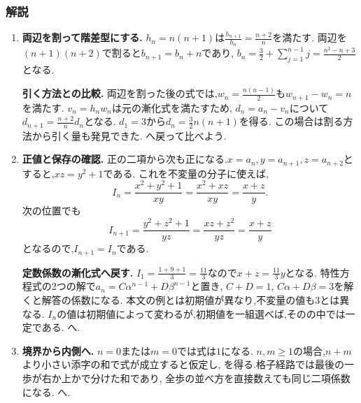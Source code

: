 \subsubsection{解説}
\begin{enumerate}[label=\textbf{問\arabic*.},format=\bookitemlink{practice-connections}{solution}{problem}]
  \item \textbf{両辺を割って階差型にする.}
    $h_n=n(n+1)$は$\frac{h_{n+1}}{h_n}=\frac{n+2}{n}$を満たす.
    両辺を$(n+1)(n+2)$で割ると$b_{n+1}=b_n+n$であり,
    $b_n=\frac32+\sum_{j=1}^{n-1}j=\frac{n^2-n+3}{2}$となる.
    \par\smallskip\textbf{引く方法との比較.}
    両辺を割った後の式では,$w_n=\frac{n(n-1)}{2}$も$w_{n+1}-w_n=n$を満たす.
    $v_n=h_nw_n$は元の漸化式を満たすため,
    $d_n=a_n-v_n$について$d_{n+1}=\frac{n+2}{n}d_n$となる.
    $d_1=3$から$d_n=\frac32n(n+1)$を得る.
    この場合は割る方法から引く量も発見できた.
    へ戻って比べよう.
  \item \textbf{正値と保存の確認.}
    正の二項から次も正になる.$x=a_n,y=a_{n+1},z=a_{n+2}$とすると,$xz=y^2+1$である.
    これを不変量の分子に使えば,
    \[
      I_n=\frac{x^2+y^2+1}{xy}
      =\frac{x^2+xz}{xy}=\frac{x+z}{y}.
    \]
    次の位置でも
    \[
      I_{n+1}=\frac{y^2+z^2+1}{yz}
      =\frac{xz+z^2}{yz}=\frac{x+z}{y}
    \]
    となるので,$I_{n+1}=I_n$である.
    \par\smallskip\textbf{定数係数の漸化式へ戻す.}
    $I_1=\frac{1+9+1}{3}=\frac{11}{3}$なので$x+z=\frac{11}{3}y$となる.
    特性方程式の2つの解で$a_n=C\alpha^{n-1}+D\beta^{n-1}$と置き,
    $C+D=1$, $C\alpha+D\beta=3$を解くと解答の係数になる.
    本文の例とは初期値が異なり,不変量の値も$3$とは異なる.
    $I_n$の値は初期値によって変わるが,初期値を一組選べば,そのの中では一定である.
    へ.
  \item \textbf{境界から内側へ.}
    $n=0$または$m=0$では式は$1$になる.
    $n,m\ge1$の場合,$n+m$より小さい添字の和で式が成立すると仮定し,
    \BookMathLayout{\[
        A_{n,m}=\binom{n+m-1}{m}+\binom{n+m-1}{m-1}
        =\binom{n+m}{m}
      \]}{\[
        \begin{aligned}
          A_{n,m}&=\binom{n+m-1}{m}+\binom{n+m-1}{m-1}\\
          &=\binom{n+m}{m}
        \end{aligned}
      \]}
    を得る.格子経路では最後の一歩が右か上かで分けた和であり,
    全歩の並べ方を直接数えても同じ二項係数になる.
    へ.

\end{enumerate}
